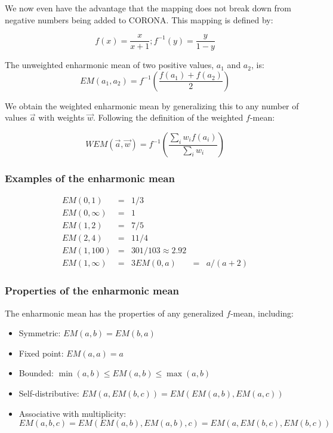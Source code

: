 \documentclass{article}
\begin{document}
We now even have the advantage that the mapping does not break down from
negative numbers being added to CORONA. This mapping is defined by:

$$f(x) = \frac{x}{x+1} ; f^{-1}(y) = \frac{y}{1-y}$$

The unweighted enharmonic mean of two positive values, $a_1$ and $a_2$, is:
\begin{equation}
EM(a_1, a_2) = f^{-1}\left(\frac{f(a_1) + f(a_2)}{2}\right)
\end{equation}

We obtain the weighted enharmonic mean by generalizing this to any number of
values $\vec{a}$ with weights $\vec{w}$. Following the definition of the
weighted $f$-mean:

\begin{equation}
WEM(\vec{a}, \vec{w}) = f^{-1}\left(
  \frac{ \sum_i w_i f(a_i) } { \sum_i w_i }
\right)
\end{equation}

\subsubsection{Examples of the enharmonic mean}
\begin{eqnarray*}
EM(0, 1) &=& 1/3\\
EM(0, \infty) &=& 1\\
EM(1, 2) &=& 7/5\\
EM(2, 4) &=& 11/4\\
EM(1, 100) &=& 301/103 \approx 2.92\\
EM(1, \infty) &=& 3
EM(0, a) &=& a/(a+2)
\end{eqnarray*}

\subsubsection{Properties of the enharmonic mean}
The enharmonic mean has the properties of any generalized $f$-mean, including:

\begin{itemize}
\item Symmetric: $EM(a, b) = EM(b, a)$
\item Fixed point: $EM(a, a) = a$
\item Bounded: $\min(a, b) \leq EM(a, b) \leq \max(a, b)$
\item Self-distributive: $EM(a, EM(b, c)) = EM(EM(a, b), EM(a, c))$
\item Associative with multiplicity: $$EM(a, b, c) = EM(EM(a, b), EM(a, b), c)
= EM(a, EM(b, c), EM(b, c))$$
\end{itemize}
\end{document}
